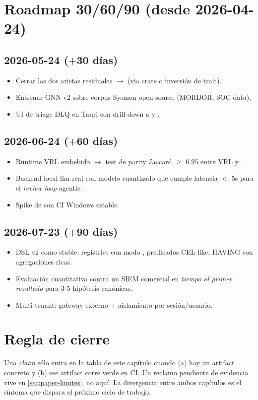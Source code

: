 \section{Roadmap 30/60/90 (desde 2026-04-24)}

\subsection*{2026-05-24 ($+$30 días)}

\begin{itemize}
    \item Cerrar las dos aristas residuales  $\to$
     (via crate 
    o inversión de trait).
    \item Entrenar GNN v2 sobre corpus Sysmon open-source
    (MORDOR, SOC data).
    \item UI de triage DLQ en Tauri con drill-down a
     y .
\end{itemize}

\subsection*{2026-06-24 ($+$60 días)}

\begin{itemize}
    \item Runtime VRL embebido $\to$ test de parity Jaccard $\ge$ 0.95
    entre VRL y .
    \item Backend local-llm real con modelo cuantizado que cumple
    latencia $<$ 5s para el \emph{review loop} agentic.
    \item Spike de  con CI Windows estable.
\end{itemize}

\subsection*{2026-07-23 ($+$90 días)}

\begin{itemize}
    \item DSL v2 como stable: registries con modo
    , predicados CEL-like, HAVING con
    agregaciones ricas.
    \item Evaluación cuantitativa contra un SIEM comercial en
    \emph{tiempo al primer resultado} para 3-5 hipótesis canónicas.
    \item Multi-tenant: gateway externo + aislamiento por
    sesión/usuario.
\end{itemize}

\section{Regla de cierre}

Una \emph{claim} sólo entra en la tabla de este capítulo cuando (a)
hay un artifact concreto y (b) ese artifact corre verde en CI. Un
reclamo pendiente de evidencia vive en \ref{sec:paper-limites}, no
aquí. La divergencia entre ambos capítulos es el síntoma que
dispara el próximo ciclo de trabajo.

